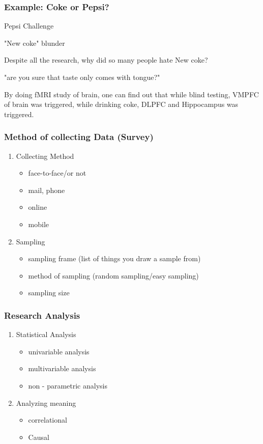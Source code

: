 \documentclass[12pt]{article}
\begin{document}
\subsubsection{Example: Coke or Pepsi?}

Pepsi Challenge

"New coke" blunder

Despite all the research, why did so many people hate New coke?

"are you sure that taste only comes with tongue?"

By doing fMRI study of brain, one can find out that while blind testing, VMPFC of brain was triggered, while drinking coke, DLPFC and Hippocampus was triggered.

\subsubsection{Method of collecting Data (Survey)}

\begin{enumerate}
	\item Collecting Method
	\begin{itemize}
		\item face-to-face/or not
		\item mail, phone
		\item online
		\item mobile
	\end{itemize}
	\item Sampling
	\begin{itemize}
		\item sampling frame (list of things you draw a sample from)
		\item method of sampling (random sampling/easy sampling)
		\item sampling size
	\end{itemize}
\end{enumerate}

\subsubsection{Research Analysis}

\begin{enumerate}
	\item Statistical Analysis
	\begin{itemize}
		\item univariable analysis
		\item multivariable analysis
		\item non - parametric analysis
	\end{itemize}
	\item Analyzing meaning
	\begin{itemize}
		\item correlational
		\item Causal
	\end{itemize}
\end{enumerate}
\end{document}
